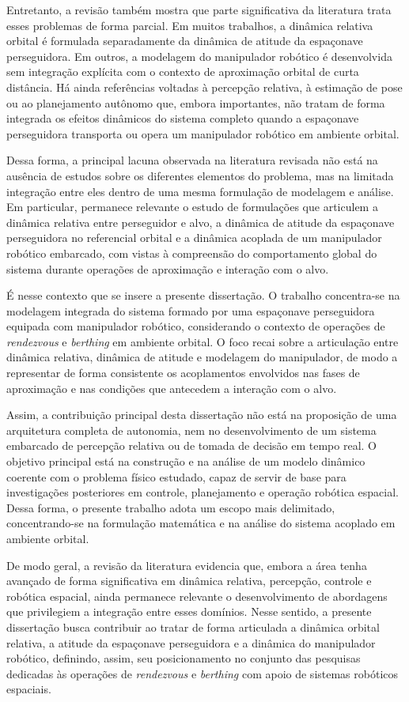 Entretanto, a revisão também mostra que parte significativa da literatura trata esses problemas de forma parcial. Em muitos trabalhos, a dinâmica relativa orbital é formulada separadamente da dinâmica de atitude da espaçonave perseguidora. Em outros, a modelagem do manipulador robótico é desenvolvida sem integração explícita com o contexto de aproximação orbital de curta distância. Há ainda referências voltadas à percepção relativa, à estimação de pose ou ao planejamento autônomo que, embora importantes, não tratam de forma integrada os efeitos dinâmicos do sistema completo quando a espaçonave perseguidora transporta ou opera um manipulador robótico em ambiente orbital.

Dessa forma, a principal lacuna observada na literatura revisada não está na ausência de estudos sobre os diferentes elementos do problema, mas na limitada integração entre eles dentro de uma mesma formulação de modelagem e análise. Em particular, permanece relevante o estudo de formulações que articulem a dinâmica relativa entre perseguidor e alvo, a dinâmica de atitude da espaçonave perseguidora no referencial orbital e a dinâmica acoplada de um manipulador robótico embarcado, com vistas à compreensão do comportamento global do sistema durante operações de aproximação e interação com o alvo.

É nesse contexto que se insere a presente dissertação. O trabalho concentra-se na modelagem integrada do sistema formado por uma espaçonave perseguidora equipada com manipulador robótico, considerando o contexto de operações de \textit{rendezvous} e \textit{berthing} em ambiente orbital. O foco recai sobre a articulação entre dinâmica relativa, dinâmica de atitude e modelagem do manipulador, de modo a representar de forma consistente os acoplamentos envolvidos nas fases de aproximação e nas condições que antecedem a interação com o alvo.

Assim, a contribuição principal desta dissertação não está na proposição de uma arquitetura completa de autonomia, nem no desenvolvimento de um sistema embarcado de percepção relativa ou de tomada de decisão em tempo real. O objetivo principal está na construção e na análise de um modelo dinâmico coerente com o problema físico estudado, capaz de servir de base para investigações posteriores em controle, planejamento e operação robótica espacial. Dessa forma, o presente trabalho adota um escopo mais delimitado, concentrando-se na formulação matemática e na análise do sistema acoplado em ambiente orbital.

De modo geral, a revisão da literatura evidencia que, embora a área tenha avançado de forma significativa em dinâmica relativa, percepção, controle e robótica espacial, ainda permanece relevante o desenvolvimento de abordagens que privilegiem a integração entre esses domínios. Nesse sentido, a presente dissertação busca contribuir ao tratar de forma articulada a dinâmica orbital relativa, a atitude da espaçonave perseguidora e a dinâmica do manipulador robótico, definindo, assim, seu posicionamento no conjunto das pesquisas dedicadas às operações de \textit{rendezvous} e \textit{berthing} com apoio de sistemas robóticos espaciais.